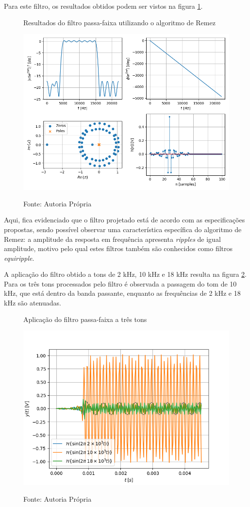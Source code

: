 \documentclass[12pt,a4paper]{report}
\begin{document}
  Para este filtro, os resultados obtidos podem ser vistos na figura \ref{fig:remez_results}.
  \begin{figure}[H]
    \caption{Resultados do filtro passa-faixa utilizando o algoritmo de Remez}
    \centering
    \includegraphics[width=\textwidth]{images/remez_results}
    \label{fig:remez_results}
    \caption*{Fonte: Autoria Própria}
  \end{figure}

  Aqui, fica evidenciado que o filtro projetado está de acordo com as especificações propostas, sendo possível observar
  uma característica específica do algoritmo de Remez: a amplitude da resposta em frequência apresenta \textit{ripples} 
  de igual amplitude, motivo pelo qual estes filtros também são conhecidos como filtros \textit{equiripple}.

  A aplicação do filtro obtido a tons de 2 kHz, 10 kHz e 18 kHz resulta na figura \ref{fig:remez_tones}. Para os três
  tons processados pelo filtro é observada a passagem do tom de 10 kHz, que está dentro da banda passante, enquanto as
  frequências de 2 kHz e 18 kHz são atenuadas.
  \begin{figure}[H]
    \caption{Aplicação do filtro passa-faixa a três tons}
    \centering
    \includegraphics[width=\textwidth]{images/remez_tones}
    \label{fig:remez_tones}
    \caption*{Fonte: Autoria Própria}
  \end{figure}
\end{document}
